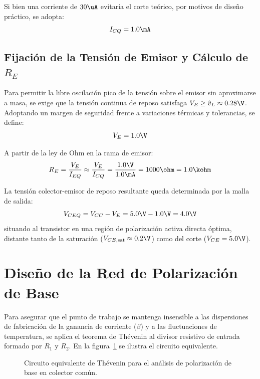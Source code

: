 Si bien una corriente de $30\uA$ evitaría el corte teórico, por motivos de diseño práctico,
se adopta:
\begin{equation}
  I_{CQ} = 1.0\mA
\end{equation}

\subsection{Fijación de la Tensión de Emisor y Cálculo de $R_E$}
Para permitir la libre oscilación pico de la tensión sobre el emisor sin aproximarse a masa, se exige que la tensión
continua de reposo satisfaga $V_E \ge \hat{v}_L \approx 0.28\V$. Adoptando un margen de seguridad frente a variaciones
térmicas y tolerancias, se define:
\begin{equation}
  V_E = 1.0\V
\end{equation}

A partir de la ley de Ohm en la rama de emisor:
\begin{equation}
  R_E = \frac{V_E}{I_{EQ}} \approx \frac{V_E}{I_{CQ}} = \frac{1.0\V}{1.0\mA} = 1000\ohm = 1.0\kohm
  \label{eq:RE_calculo}
\end{equation}

La tensión colector-emisor de reposo resultante queda determinada por la malla de salida:
\begin{equation}
  V_{CEQ} = V_{CC} - V_E = 5.0\V - 1.0\V = 4.0\V
  \label{eq:VCEQ_calculo}
\end{equation}
situando al transistor en una región de polarización activa directa óptima, distante tanto de la saturación
($V_{CE,\mathrm{sat}} \approx 0.2\V$) como del corte ($V_{CE} = 5.0\V$).

\section{Diseño de la Red de Polarización de Base}

Para asegurar que el punto de trabajo se mantenga insensible a las dispersiones de fabricación de la ganancia
de corriente ($\beta$) y a las fluctuaciones de temperatura, se aplica el teorema de Thévenin al divisor resistivo
de entrada formado por $R_1$ y $R_2$. En la figura~\ref{crkt:thevenin} se ilustra el circuito equivalente.

\begin{figure}[!ht]
  \centering
  
  \caption{Circuito equivalente de Thévenin para el análisis de polarización de base en colector común.}
  \label{crkt:thevenin}
\end{figure}

